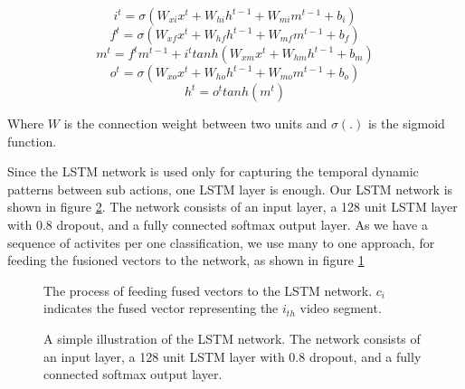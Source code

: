 \begin{equation}
i^{t} = \sigma (W_{xi}x^t + W_{hi}h^{t-1} + W_{mi}m^{t-1} + b_{i})
\end{equation}
\begin{equation}
f^{t} = \sigma (W_{xf}x^t + W_{hf}h^{t-1} + W_{mf}m^{t-1} + b_{f})
\end{equation}
\begin{equation}
m^{t} = f^tm^{t-1} + i^ttanh(W_{xm}x^t + W_{hm}h^{t-1} + b_{m})
\end{equation}
\begin{equation}
o^{t} = \sigma (W_{xo}x^t + W_{ho}h^{t-1} + W_{mo}m^{t-1} + b_{o})
\end{equation}
\begin{equation}
h^t = o^ttanh(m^t)
\end{equation}

Where $W$ is the connection weight between two units and $\sigma(.)$ is the sigmoid function.

Since the LSTM network is used only for capturing the temporal dynamic patterns between sub actions, one LSTM layer is enough.
Our LSTM network is shown in figure \ref{fi:layers}. The network consists of an input layer, a 128 unit LSTM layer with 0.8 dropout, and
a fully connected softmax output layer. As we have a sequence of activites per one classification, we use many to one approach,
for feeding the fusioned vectors to the network, as shown in figure \ref{fi:lstm}

\begin{figure}
  \centering
  
  \caption{The process of feeding fused vectors to the LSTM network. $c_{i}$ indicates the fused vector representing the $i_{th}$
  video segment.}\label{fi:lstm}
\end{figure}

\begin{figure}
  \centering
  
  \caption{A simple illustration of the LSTM network. The network consists of an input layer, a 128 unit LSTM layer with 0.8 dropout, and
a fully connected softmax output layer.}\label{fi:layers}
\end{figure}

